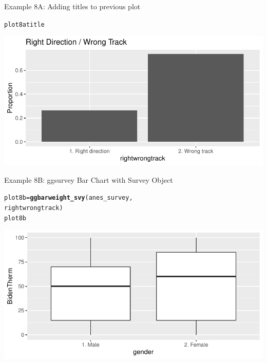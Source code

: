 \documentclass{beamer}\usepackage[]{graphicx}\usepackage[]{xcolor}
\makeatletter
\newcommand{\hlstd}[1]{\textcolor[rgb]{0.345,0.345,0.345}{#1}}%
\newcommand{\hlkwb}[1]{\textcolor[rgb]{0.69,0.353,0.396}{#1}}%
\newcommand{\hlkwd}[1]{\textcolor[rgb]{0.737,0.353,0.396}{\textbf{#1}}}%
\newenvironment{kframe}{%
 \def\at@end@of@kframe{}%
 \ifinner\ifhmode%
  \def\at@end@of@kframe{\end{minipage}}%
  \begin{minipage}{\columnwidth}%
 \fi\fi%
 \def\FrameCommand##1{\hskip\@totalleftmargin \hskip-\fboxsep
 \colorbox{shadecolor}{##1}\hskip-\fboxsep
     \hskip-\linewidth \hskip-\@totalleftmargin \hskip\columnwidth}%
 \MakeFramed {\advance\hsize-\width
   \@totalleftmargin\z@ \linewidth\hsize
   \@setminipage}}%
 {\par\unskip\endMakeFramed%
 \at@end@of@kframe}
\newenvironment{knitrout}{}{} %
\makeatother
\begin{document}
\begin{frame}[fragile]{Example 8A: Adding titles to previous plot}
\begin{knitrout}
\color{fgcolor}\begin{kframe}
\begin{alltt}
\hlstd{plot8atitle}
\end{alltt}
\end{kframe}
\includegraphics[width=0.95\linewidth]{figure/unnamed-chunk-46-1} 
\end{knitrout}
\end{frame}
\begin{frame}[fragile]{Example 8B: ggsurvey Bar Chart with Survey Object }
\begin{knitrout}
\color{fgcolor}\begin{kframe}
\begin{alltt}
\hlstd{plot8b} \hlkwb{=} \hlkwd{ggbarweight_svy}\hlstd{(anes_survey,}
    \hlstd{rightwrongtrack)}
\hlstd{plot8b}
\end{alltt}
\end{kframe}
\includegraphics[width=0.95\linewidth]{figure/unnamed-chunk-47-1} 
\end{knitrout}
\end{frame}
\end{document}
